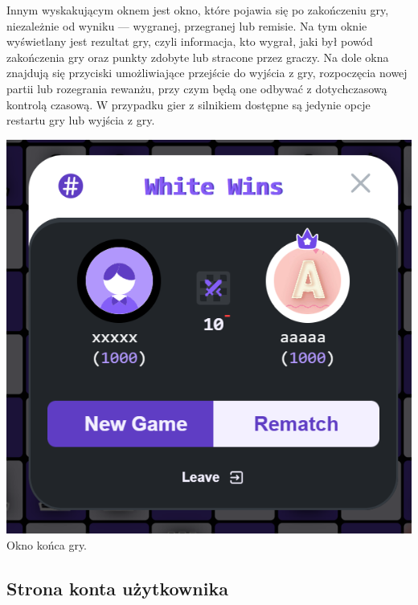\documentclass[12pt,a4paper]{article}
\begin{document}
\begin{minipage}[t]{0.55\textwidth} 
    \vspace{0pt} 
    \justifying 
    \noindent 
    Innym wyskakującym oknem jest okno, które pojawia się po zakończeniu gry, niezależnie od wyniku — wygranej, przegranej lub remisie. Na tym oknie wyświetlany jest rezultat gry, czyli informacja, kto wygrał, jaki był powód zakończenia gry oraz punkty zdobyte lub stracone przez graczy. Na dole okna znajdują się przyciski umożliwiające przejście do wyjścia z gry, rozpoczęcia nowej partii lub rozegrania rewanżu, przy czym będą one odbywać z dotychczasową kontrolą czasową. W przypadku gier z silnikiem dostępne są jedynie opcje restartu gry lub wyjścia z gry.
\end{minipage} 
\hfill 
\begin{minipage}[t]{0.35\textwidth} 
    \vspace{0pt} 
    \centering 
    \includegraphics[width=\linewidth]{images/ins_min_win.png} 
    Okno końca gry.
\end{minipage}

\newpage

\subsection{Strona konta użytkownika}
\end{document}

